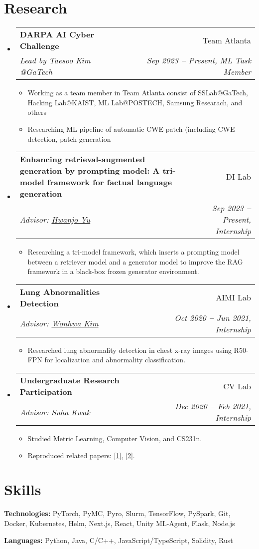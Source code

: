 \documentclass[letterpaper,11pt]{article}
\newcommand{\resumeItem}[1]{
  \item\small{
    {#1 \vspace{-2pt}}
  }
}
\newcommand{\resumeSubheading}[4]{
  \vspace{-2pt}\item
    \begin{tabularx}{0.97\textwidth}[t]{Xr}
      \textbf{#1} & #2 \\
      \textit{\small#3} & \textit{\small #4} \\
    \end{tabularx}\vspace{-7pt}
}
\newcommand{\resumeSubHeadingListStart}{\begin{itemize}[leftmargin=0.15in, label={}]}
\newcommand{\resumeSubHeadingListEnd}{\end{itemize}}
\newcommand{\resumeItemListStart}{\begin{itemize}}
\newcommand{\resumeItemListEnd}{\end{itemize}\vspace{-5pt}}
\begin{document}
\section{Research}
\vspace{3pt}
\resumeSubHeadingListStart
\resumeSubheading
{DARPA AI Cyber Challenge}
{Team Atlanta}
{Lead by Taesoo Kim @GaTech}
{Sep 2023 \textbf{--} Present, ML Task Member}
\resumeItemListStart
\resumeItem{Working as a team member in Team Atlanta consist of SSLab@GaTech, Hacking Lab@KAIST, ML Lab@POSTECH, Samsung Researach, and others}
\resumeItem{Researching ML pipeline of automatic CWE patch (including CWE detection, patch generation}
\resumeItemListEnd
\resumeSubheading
{Enhancing retrieval-augmented generation by prompting model: A tri-model framework for factual language generation}
{DI Lab}
{Advisor: \href{https://sites.google.com/view/postechdi/member/faculty}{Hwanjo Yu}}
{Sep 2023 \textbf{--} Present, Internship}
\resumeItemListStart
\resumeItem{Researching a tri-model framework, which inserts a prompting model between a retriever model and a generator model to improve the RAG framework in a black-box frozen generator environment.}
\resumeItemListEnd

\resumeSubheading
{Lung Abnormalities Detection}
{AIMI Lab}
{Advisor: \href{https://miv.postech.ac.kr/members/}{Wonhwa Kim}}
{Oct 2020 \textbf{--} Jun 2021, Internship}
\resumeItemListStart
\resumeItem{Researched lung abnormality detection in chest x-ray images using R50-FPN for localization and abnormality classification.}
\resumeItemListEnd

\resumeSubheading
{Undergraduate Research Participation}
{CV Lab}
{Advisor: \href{https://suhakwak.github.io/index.html}{Suha Kwak}}
{Dec 2020 \textbf{--} Feb 2021, Internship}
\resumeItemListStart
\resumeItem{Studied Metric Learning, Computer Vision, and CS231n.}
\resumeItem{Reproduced related papers: \href{https://arxiv.org/abs/1805.08974}{[1]}, \href{https://arxiv.org/abs/2010.01412}{[2]}.}

\resumeItemListEnd

\resumeSubHeadingListEnd


\section{Skills}
\vspace{2pt}
\resumeSubHeadingListStart
\small{\item{
              \textbf{Technologies:} {PyTorch, PyMC, Pyro, Slurm, TensorFlow, PySpark, Git, Docker, Kubernetes, Helm, Next.js, React, Unity ML-Agent, Flask, Node.js }

              \textbf{Languages:} {Python, Java, C/C++, JavaScript/TypeScript, Solidity, Rust} \\ \vspace{3pt}
        }}
\resumeSubHeadingListEnd
\end{document}
